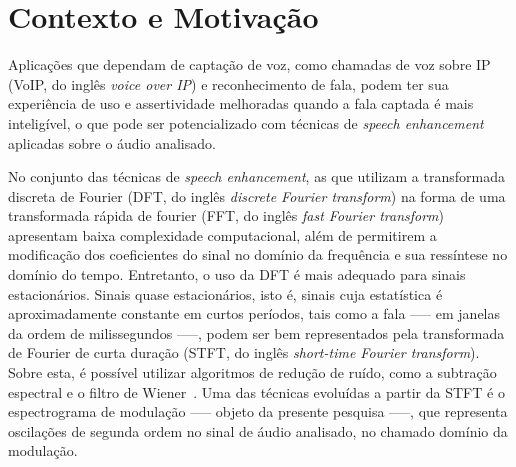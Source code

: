 \section{Contexto e Motivação}

Aplicações que dependam de captação de voz, como chamadas de voz sobre IP (VoIP,
 do inglês \textit{voice over IP}) e reconhecimento de fala, podem ter sua
 experiência de uso e assertividade melhoradas quando a fala captada é mais
 inteligível, o que pode ser potencializado com técnicas de \textit{speech
 enhancement} aplicadas sobre o áudio analisado.

No conjunto das técnicas de \textit{speech enhancement}, as que utilizam a
transformada discreta de Fourier (DFT, do inglês \textit{discrete Fourier
transform}) na forma de uma transformada rápida de fourier (FFT, do inglês
\textit{fast Fourier transform}) apresentam baixa complexidade computacional,
além de permitirem a modificação dos coeficientes do sinal no domínio da
frequência e sua ressíntese no domínio do tempo. Entretanto, o uso da DFT é mais
adequado para sinais estacionários. Sinais quase estacionários, isto é, sinais
cuja estatística é aproximadamente constante em curtos períodos, tais como a
fala —-- em janelas da ordem de milissegundos —--, podem ser bem representados
pela transformada de Fourier de curta duração (STFT, do inglês
\textit{short-time Fourier transform}). Sobre esta, é possível utilizar
algoritmos de redução de ruído, como a subtração espectral e o filtro de
Wiener~\cite{parchami2016}. Uma das técnicas evoluídas a partir da STFT é o
espectrograma de modulação —-- objeto da presente pesquisa —--, que representa
oscilações de segunda ordem no sinal de áudio analisado, no chamado domínio da
modulação.

